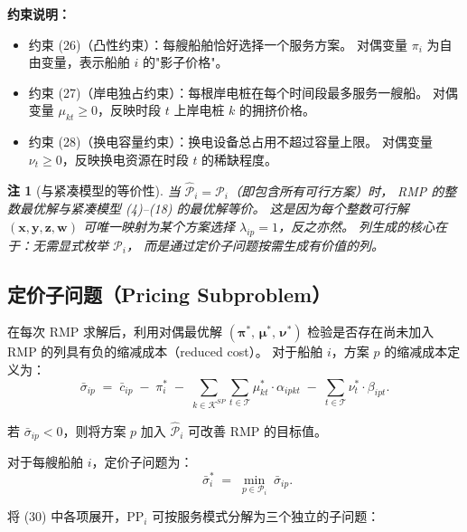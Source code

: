 \documentclass[11pt,a4paper]{article}
\newtheorem{remark}{注}
\begin{document}
\noindent\textbf{约束说明：}
\begin{itemize}
  \item 约束 (26)（凸性约束）：每艘船舶恰好选择一个服务方案。
        对偶变量 $\pi_i$ 为自由变量，表示船舶 $i$ 的"影子价格"。
  \item 约束 (27)（岸电独占约束）：每根岸电桩在每个时间段最多服务一艘船。
        对偶变量 $\mu_{kt} \geq 0$，反映时段 $t$ 上岸电桩 $k$ 的拥挤价格。
  \item 约束 (28)（换电容量约束）：换电设备总占用不超过容量上限。
        对偶变量 $\nu_t \geq 0$，反映换电资源在时段 $t$ 的稀缺程度。
\end{itemize}

\begin{remark}[与紧凑模型的等价性]
当 $\hat{\mathcal{P}}_i = \mathcal{P}_i$（即包含所有可行方案）时，
RMP 的整数最优解与紧凑模型 (4)--(18) 的最优解等价。
这是因为每个整数可行解
$(\mathbf{x}, \mathbf{y}, \mathbf{z}, \mathbf{w})$
可唯一映射为某个方案选择 $\lambda_{ip} = 1$，反之亦然。
列生成的核心在于：无需显式枚举 $\mathcal{P}_i$，
而是通过定价子问题按需生成有价值的列。
\end{remark}

\subsection{定价子问题（Pricing Subproblem）}

在每次 RMP 求解后，利用对偶最优解 $(\boldsymbol{\pi}^*,\, \boldsymbol{\mu}^*,\, \boldsymbol{\nu}^*)$
检验是否存在尚未加入 RMP 的列具有负的缩减成本（reduced cost）。
对于船舶 $i$，方案 $p$ 的缩减成本定义为：
%
\begin{equation}
  \bar{\sigma}_{ip}
  \;=\; \bar{c}_{ip}
  \;-\; \pi_i^*
  \;-\; \sum_{k \in \mathcal{K}^{SP}} \sum_{t \in \mathcal{T}}
    \mu_{kt}^* \cdot \alpha_{ipkt}
  \;-\; \sum_{t \in \mathcal{T}} \nu_t^* \cdot \beta_{ipt}.
  \tag{30}
\end{equation}

\noindent
若 $\bar{\sigma}_{ip} < 0$，则将方案 $p$ 加入 $\hat{\mathcal{P}}_i$
可改善 RMP 的目标值。

对于每艘船舶 $i$，定价子问题为：
\begin{equation}
  [\text{PP}_i] \qquad
  \bar{\sigma}_i^* \;=\;
  \min_{p \in \mathcal{P}_i} \; \bar{\sigma}_{ip}.
  \tag{31}
\end{equation}

\noindent
将 (30) 中各项展开，$\text{PP}_i$ 可按服务模式分解为三个独立的子问题：
\end{document}
